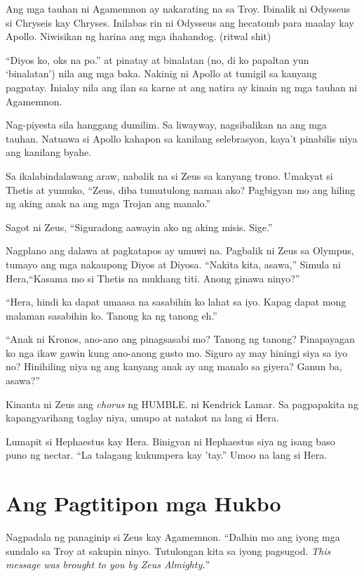 \documentclass[12pt,letterpaper]{report}
\begin{document}
Ang mga tauhan ni Agamemnon ay nakarating na sa Troy. Ibinalik ni Odysseus si Chryseis kay Chryses. Inilabas rin ni Odysseus ang hecatomb para maalay kay Apollo. Niwisikan ng harina ang mga ihahandog. (ritwal shit)

``Diyos ko, oks na po.'' at pinatay at binalatan (no, di ko papaltan yun `binalatan') nila ang mga baka. Nakinig ni Apollo at tumigil sa kanyang pagpatay. Inialay nila ang ilan sa karne at ang natira ay kinain ng mga tauhan ni Agamemnon.

Nag-piyesta sila hanggang dumilim. Sa liwayway, nagsibalikan na ang mga tauhan. Natuawa si Apollo kahapon sa kanilang selebrasyon, kaya't pinabilis niya ang kanilang byahe.

Sa ikalabindalawang araw, nabalik na si Zeus sa kanyang trono. Umakyat si Thetis at yumuko, ``Zeus, diba tumutulong naman ako? Pagbigyan mo ang hiling ng aking anak na ang mga Trojan ang manalo.''

Sagot ni Zeus, ``Siguradong aawayin ako ng aking misis. Sige.''

Nagplano ang dalawa at pagkatapos ay umuwi na. Pagbalik ni Zeus sa Olympus, tumayo ang mga nakaupong Diyos at Diyosa. ``Nakita kita, asawa,'' Simula ni Hera,``Kasama mo si Thetis na mukhang titi. Anong ginawa ninyo?''

``Hera, hindi ka dapat umaasa na sasabihin ko lahat sa iyo. Kapag dapat mong malaman sasabihin ko. Tanong ka ng tanong eh.''

``Anak ni Kronos, ano-ano ang pinagsasabi mo? Tanong ng tanong? Pinapayagan ko nga ikaw gawin kung ano-anong gusto mo. Siguro ay may hiningi siya sa iyo no? Hinihiling niya ng ang kanyang anak ay ang manalo sa giyera? Ganun ba, asawa?''

Kinanta ni Zeus ang \textit{chorus} ng HUMBLE. ni Kendrick Lamar. Sa pagpapakita ng kapangyarihang taglay niya, umupo at natakot na lang si Hera.

Lumapit si Hephaestus kay Hera. Binigyan ni Hephaestus siya ng isang baso puno ng nectar. ``La talagang kukumpera kay 'tay.'' Umoo na lang si Hera.

\pagebreak
\chapter{Ang Pagtitipon mga Hukbo} %

Nagpadala ng panaginip si Zeus kay Agamemnon. ``Dalhin mo ang iyong mga sundalo sa Troy at sakupin ninyo. Tutulongan kita sa iyong pagsugod. \textit{This message was brought to you by Zeus Almighty.}''
\end{document}
